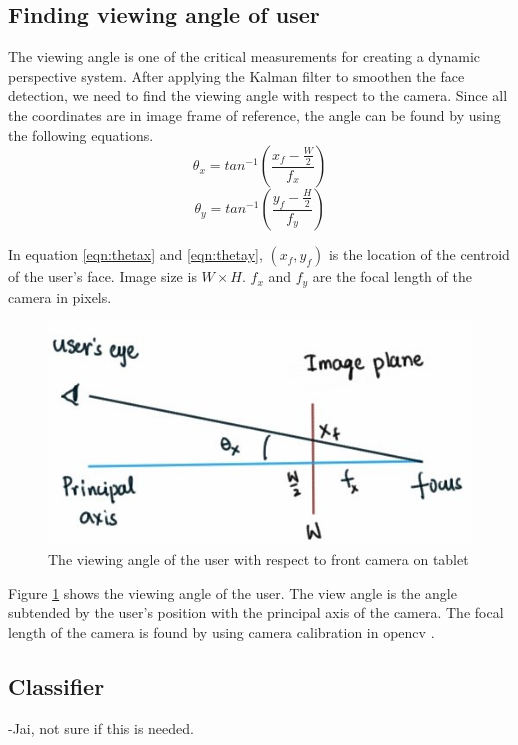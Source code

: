 \documentclass[12pt,twocolumn,letterpaper]{article}
\begin{document}
\subsection{Finding viewing angle of user}
The viewing angle is one of the critical measurements for creating a dynamic perspective system. After applying the Kalman filter to smoothen the face detection, we need to find the viewing angle with respect to the camera. Since all the coordinates are in image frame of reference, the angle can be found by using the following equations. 
\begin{equation}
\theta_x = tan^{-1} \left( \frac{x_f - \frac{W}{2}}{f_x} \right)
\label{eqn:thetax}
\end{equation}
\begin{equation}
\theta_y = tan^{-1} \left( \frac{y_f - \frac{H}{2}}{f_y} \right)
\label{eqn:thetay}
\end{equation}

In equation \ref{eqn:thetax} and \ref{eqn:thetay}, $(x_f, y_f)$ is the location of the centroid of the user's face. Image size is $W \times H$. $f_x$ and $f_y$ are the focal length of the camera in pixels.

\begin{figure}
\includegraphics[scale=0.5]{images/view_angle}
\caption{The viewing angle of the user with respect to front camera on tablet}
\label{fig:viewangle}
\end{figure}

Figure \ref{fig:viewangle} shows the viewing angle of the user. The view angle is the angle subtended by the user's position with the principal axis of the camera. The focal length of the camera is found by using camera calibration in opencv \cite{calibration}.


\subsection{Classifier}
    -Jai, not sure if this is needed.
\end{document}
